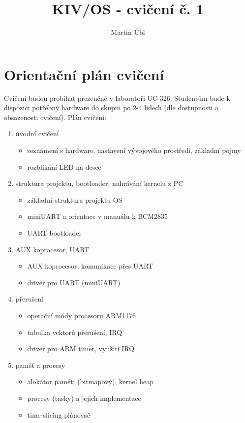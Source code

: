 \documentclass{article}
\author{Martin Úbl}
\title{KIV/OS - cvičení č. 1}
\begin{document}
\maketitle

\section{Orientační plán cvičení}

Cvičení budou probíhat prezenčně v laboratoři UC-326. Studentům bude k dispozici potřebný hardware do skupin po 2-4 lidech (dle dostupnosti a obsazenosti cvičení). Plán cvičení:

\begin{enumerate}
	\item úvodní cvičení
	\begin{itemize}
		\item seznámení s hardware, nastavení vývojového prostředí, základní pojmy
		\item rozblikání LED na desce
	\end{itemize}

	\item struktura projektu, bootloader, nahrávání kernelu z PC
	\begin{itemize}
		\item základní struktura projektu OS
		\item miniUART a orientace v manuálu k BCM2835
		\item UART bootloader
	\end{itemize}

	\item AUX koprocesor, UART
	\begin{itemize}
		\item AUX koprocesor, komunikace přes UART
		\item driver pro UART (miniUART)
	\end{itemize}

	\item přerušení
	\begin{itemize}
		\item operační módy procesoru ARM1176
		\item tabulka vektorů přerušení, IRQ
		\item driver pro ARM timer, využití IRQ
	\end{itemize}

	\item paměť a procesy
	\begin{itemize}
		\item alokátor paměti (bitmapový), kernel heap
		\item procesy (tasky) a jejich implementace
		\item time-slicing plánovač
	\end{itemize}


\end{enumerate}
\end{document}

